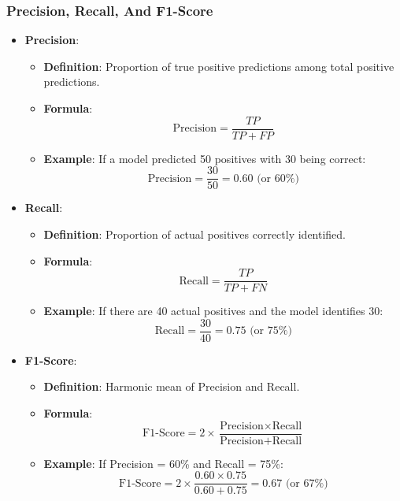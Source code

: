\documentclass[aspectratio=169]{beamer}
\begin{document}
\begin{frame}[fragile]
    \frametitle{Precision, Recall, And F1-Score}
    \begin{itemize}
        \item \textbf{Precision}:
        \begin{itemize}
            \item \textbf{Definition}: Proportion of true positive predictions among total positive predictions.
            \item \textbf{Formula}:
            \begin{equation}
            \text{Precision} = \frac{TP}{TP + FP}
            \end{equation}
            \item \textbf{Example}:
            If a model predicted 50 positives with 30 being correct:
            \begin{equation}
            \text{Precision} = \frac{30}{50} = 0.60 \text{ (or 60\%)} 
            \end{equation}
        \end{itemize}
        
        \item \textbf{Recall}:
        \begin{itemize}
            \item \textbf{Definition}: Proportion of actual positives correctly identified.
            \item \textbf{Formula}:
            \begin{equation}
            \text{Recall} = \frac{TP}{TP + FN}
            \end{equation}
            \item \textbf{Example}:
            If there are 40 actual positives and the model identifies 30:
            \begin{equation}
            \text{Recall} = \frac{30}{40} = 0.75 \text{ (or 75\%)} 
            \end{equation}
        \end{itemize}

        \item \textbf{F1-Score}:
        \begin{itemize}
            \item \textbf{Definition}: Harmonic mean of Precision and Recall.
            \item \textbf{Formula}:
            \begin{equation}
            \text{F1-Score} = 2 \times \frac{\text{Precision} \times \text{Recall}}{\text{Precision} + \text{Recall}}
            \end{equation}
            \item \textbf{Example}:
            If Precision = 60\% and Recall = 75\%:
            \begin{equation}
            \text{F1-Score} = 2 \times \frac{0.60 \times 0.75}{0.60 + 0.75} = 0.67 \text{ (or 67\%)} 
            \end{equation}
        \end{itemize}
    \end{itemize}
\end{frame}
\end{document}
